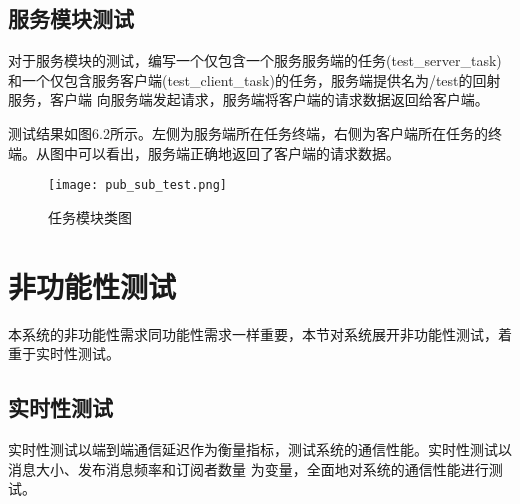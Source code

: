 \subsection{服务模块测试}
对于服务模块的测试，编写一个仅包含一个服务服务端的任务(test\_server\_task)和一个仅包含服务客户端(test\_client\_task)的任务，服务端提供名为/test的回射服务，客户端
向服务端发起请求，服务端将客户端的请求数据返回给客户端。


测试结果如图6.2所示。左侧为服务端所在任务终端，右侧为客户端所在任务的终端。从图中可以看出，服务端正确地返回了客户端的请求数据。
\begin{figure}[H]
  \centering
  \texttt{[image: pub\_sub\_test.png]}
  \caption{任务模块类图}
  \label{pub_sub_test}
\end{figure}
\section{非功能性测试}
本系统的非功能性需求同功能性需求一样重要，本节对系统展开非功能性测试，着重于实时性测试。

\subsection{实时性测试}
实时性测试以端到端通信延迟作为衡量指标，测试系统的通信性能。实时性测试以消息大小、发布消息频率和订阅者数量
为变量，全面地对系统的通信性能进行测试。
